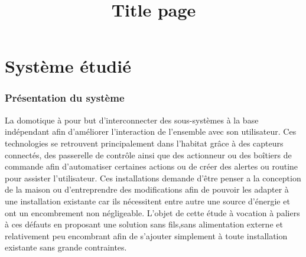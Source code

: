 \documentclass{rapportENS}
\title{Title page}
\begin{document}
\enseignant{}

\fairepagedegarde %
\tabledematieres %


\part{Système étudié}
 \section{Présentation du système}
 La domotique à pour but d'interconnecter des sous-systèmes à la base indépendant afin d'améliorer l'interaction de l'ensemble avec son utilisateur. Ces technologies se retrouvent principalement dans l'habitat grâce à des capteurs connectés, des passerelle de contrôle ainsi que des actionneur ou des boîtiers de commande afin d'automatiser certaines actions ou de créer des alertes ou routine pour assister l'utilisateur. Ces installations demande d'être penser a la conception de la maison ou d'entreprendre des modifications afin de pouvoir les adapter à une installation existante car ils nécessitent entre autre une source d'énergie et ont un encombrement non négligeable. L'objet de cette étude à vocation à paliers à ces défauts en proposant une solution sans fils,sans alimentation externe et relativement peu encombrant afin de s'ajouter simplement à toute installation existante sans grande contraintes. 
 
\end{document}
